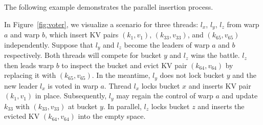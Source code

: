 \vspace{1mm}





The following example demonstrates the parallel insertion process.
\begin{example}
	In Figure~\ref{fig:voter}, we visualize a scenario for three threads: $l_x$, $l_y$, $l_z$ from warp $a$ and warp $b$, which insert KV pairs $(k_1,v_1)$, $(k_{33},v_{33})$, and $(k_{65},v_{65})$ independently. 
	Suppose that $l_y$ and $l_z$ become the leaders of warp $a$ and $b$ respectively. Both threads will compete for bucket $y$ and $l_z$ wins the battle. 
	$l_z$ then leads warp $b$ to inspect the bucket and evict KV pair $(k_{64},v_{64})$ by replacing it with $(k_{65},v_{65})$. 
	In the meantime, $l_y$ does not lock bucket $y$ and the new leader $l_x$ is voted in warp $a$. 
	Thread $l_x$ locks bucket $x$ and inserts KV pair $(k_1,v_1)$ in place. Subsequently, $l_y$ may regain the control of warp $a$ and update $k_{33}$ with $(k_{33},v_{33})$ at bucket $y$. In parallel, $l_z$ locks bucket $z$ and inserts the evicted KV $(k_{64},v_{64})$ into the empty space. 
\end{example}

